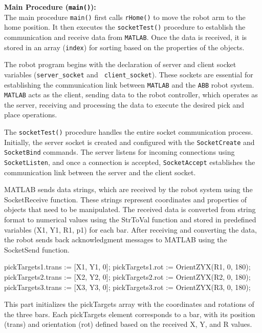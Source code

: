 \textbf{Main Procedure (\texttt{main()}):} \\
The main procedure \texttt{main()} first calls \texttt{rHome()} to move the robot arm to the home position. It then executes the \texttt{socketTest()} procedure to establish the communication and receive data from \texttt{MATLAB}. Once the data is received, it is stored in an array (\texttt{index}) for sorting based on the properties of the objects.

The robot program begins with the declaration of server and client socket variables (\texttt{server\_socket} and \texttt{ client\_socket}). These sockets are essential for establishing the communication link between \texttt{MATLAB} and the \texttt{ABB} robot system. \texttt{MATLAB} acts as the client, sending data to the robot controller, which operates as the server, receiving and processing the data to execute the desired pick and place operations.

The \texttt{socketTest()} procedure handles the entire socket communication process. Initially, the server socket is created and configured with the \texttt{SocketCreate} and \texttt{SocketBind} commands. The server listens for incoming connections using \texttt{SocketListen}, and once a connection is accepted, \texttt{SocketAccept} establishes the communication link between the server and the client socket.


MATLAB sends data strings, which are received by the robot system using the SocketReceive function. These strings represent coordinates and properties of objects that need to be manipulated. The received data is converted from string format to numerical values using the StrToVal function and stored in predefined variables (X1, Y1, R1, p1) for each bar. After receiving and converting the data, the robot sends back acknowledgment messages to MATLAB using the SocketSend function.

\begin{center}
pickTargets{1}.trans := [X1, Y1, 0]; pickTargets{1}.rot := OrientZYX(R1, 0, 180); \\
pickTargets{2}.trans := [X2, Y2, 0]; pickTargets{2}.rot := OrientZYX(R2, 0, 180); \\
pickTargets{3}.trans := [X3, Y3, 0]; pickTargets{3}.rot := OrientZYX(R3, 0, 180); 
\end{center}



This part initializes the pickTargets array with the coordinates and rotations of the three bars. Each pickTargets element corresponds to a bar, with its position (trans) and orientation (rot) defined based on the received X, Y, and R values.


